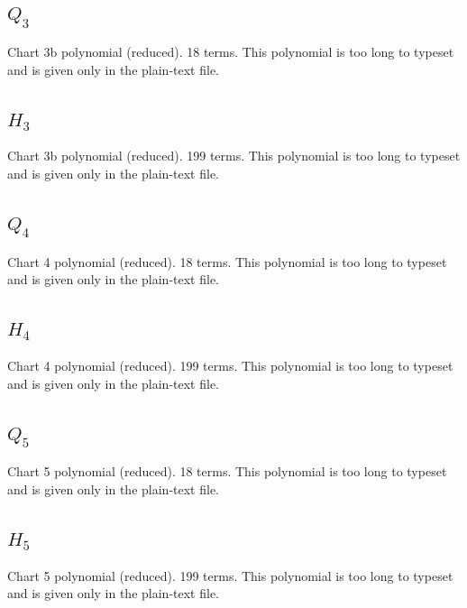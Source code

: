 \subsection*{$Q_3$}
Chart 3b polynomial (reduced). 18 terms.
This polynomial is too long to typeset and is given only in the plain-text file.

\subsection*{$H_3$}
Chart 3b polynomial (reduced). 199 terms.
This polynomial is too long to typeset and is given only in the plain-text file.

\subsection*{$Q_4$}
Chart 4 polynomial (reduced). 18 terms.
This polynomial is too long to typeset and is given only in the plain-text file.

\subsection*{$H_4$}
Chart 4 polynomial (reduced). 199 terms.
This polynomial is too long to typeset and is given only in the plain-text file.

\subsection*{$Q_5$}
Chart 5 polynomial (reduced). 18 terms.
This polynomial is too long to typeset and is given only in the plain-text file.

\subsection*{$H_5$}
Chart 5 polynomial (reduced). 199 terms.
This polynomial is too long to typeset and is given only in the plain-text file.



